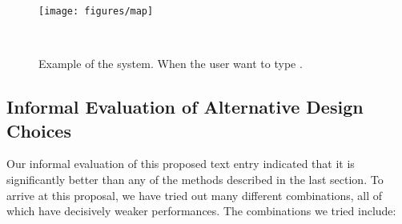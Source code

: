 \begin{figure}
  \centering
  \texttt{[image: figures/map]}
  \caption{Example of the system.  When the user want to type .}
  ~\label{fig:example}
\end{figure}

\subsection{Informal Evaluation of Alternative Design Choices}

Our informal evaluation of this proposed text entry indicated that it is significantly better than any of the methods described in the last section.   To arrive at this proposal, we have tried out many different combinations, all of which have decisively weaker performances.  The combinations we tried include: 

